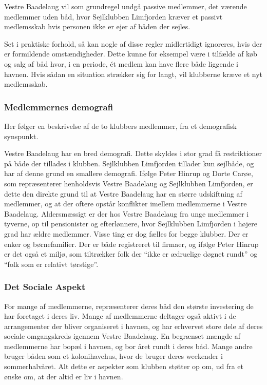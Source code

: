 Vestre Baadelaug vil som grundregel undgå passive medlemmer, det værende medlemmer uden båd, hvor Sejlklubben Limfjorden kræver et passivt medlemsskab hvis personen ikke er ejer af båden der sejles.

Set i praktiske forhold, så kan nogle af disse regler midlertidigt ignoreres, hvis der er formildende omstændigheder. Dette kunne for eksempel være i tilfælde af køb og salg af båd hvor, i en periode, ét medlem kan have flere både liggende i havnen. Hvis sådan en situation strækker sig for langt, vil klubberne kræve et nyt medlemsskab.

\subsubsection{Medlemmernes demografi}

Her følger en beskrivelse af de to klubbers medlemmer, fra et demografisk synspunkt.

Vestre Baadelaug har en bred demografi. Dette skyldes i stor grad få restriktioner på både der tillades i klubben. Sejlklubben Limfjorden tillader kun sejlbåde, og har af denne grund en smallere demografi. Ifølge Peter Hinrup og Dorte Carøe, som repræsenterer henholdsvis Vestre Baadelaug og Sejlklubben Limfjorden, er dette den direkte grund til at Vestre Baadelaug har en større udskiftning af medlemmer, og at der oftere opstår konflikter imellem medlemmerne i Vestre Baadelaug. Aldersmæssigt er der hos Vestre Baadelaug fra unge medlemmer i tyverne, op til pensionister og efterlønnere, hvor Sejlklubben Limfjorden i højere grad har ældre medlemmer. Visse ting er dog fælles for begge klubber. Der er enker og børnefamilier. Der er både registreret til firmaer, og ifølge Peter Hinrup er det også et miljø, som tiltrækker folk der \enquote{ikke er ædruelige døgnet rundt} og \enquote{folk som er relativt tørstige}.


\subsubsection{Det Sociale Aspekt}

For mange af medlemmerne, repræsenterer deres båd den største investering de har foretaget i deres liv. Mange af medlemmerne deltager også aktivt i de arrangementer der bliver organiseret i havnen, og har erhvervet store dele af deres sociale omgangskreds igennem Vestre Baadelaug. En begrænset mængde af medlemmerne har bopæl i havnen, og bor året rundt i deres båd. Mange andre bruger båden som et kolonihavehus, hvor de bruger deres weekender i sommerhalvåret. Alt dette er aspekter som klubben støtter op om, ud fra et ønske om, at der altid er liv i havnen.



